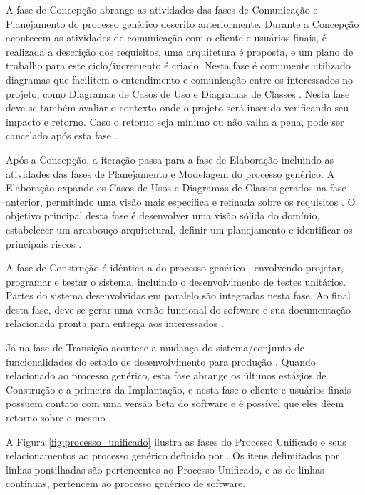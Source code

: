 A fase de Concepção abrange as atividades das fases de Comunicação e Planejamento do processo genérico descrito anteriormente. Durante a Concepção acontecem as atividades de comunicação com o cliente e usuários finais, é realizada a descrição dos requisitos, uma arquitetura é proposta, e um plano de trabalho para este ciclo/incremento é criado. Nesta fase é comumente utilizado diagramas que facilitem o entendimento e comunicação entre os interessados no projeto, como Diagramas de Casos de Uso e Diagramas de Classes \cite{pressman06}. Nesta fase deve-se também avaliar o contexto onde o projeto será inserido verificando seu impacto e retorno. Caso o retorno seja mínimo ou não valha a pena, pode ser cancelado após esta fase \cite{sommerville10}.

Após a Concepção, a iteração passa para a fase de Elaboração incluindo as atividades das fases de Planejamento e Modelagem do processo genérico. A Elaboração expande os Casos de Usos e Diagramas de Classes gerados na fase anterior, permitindo uma visão mais específica e refinada sobre os requisitos \cite{pressman06}. O objetivo principal desta fase é desenvolver uma visão sólida do domínio, estabelecer um arcabouço arquitetural, definir um planejamento e identificar os principais riscos \cite{sommerville10}.

A fase de Construção é idêntica a do processo genérico \cite{pressman06}, envolvendo projetar, programar e testar o sistema, incluindo o desenvolvimento de testes unitários. Partes do sistema desenvolvidas em paralelo são integradas nesta fase. Ao final desta fase, deve-se gerar uma versão funcional do software e sua documentação relacionada pronta para entrega aos interessados \cite{sommerville10}. 

Já na fase de Transição acontece a mudança do sistema/conjunto de funcionalidades do estado de desenvolvimento para produção \cite{sommerville10}. Quando relacionado ao processo genérico, esta fase abrange os últimos estágios de Construção e a primeira da Implantação, e nesta fase o cliente e usuários finais possuem contato com uma versão beta do software e é possível que eles dêem retorno sobre o mesmo  \cite{pressman06}.

A Figura \ref{fig:processo_unificado} ilustra as fases do Processo Unificado e seus relacionamentos ao processo genérico definido por . Os itens delimitados por linhas pontilhadas são pertencentes ao Processo Unificado, e as de linhas contínuas, pertencem ao processo genérico de software.

